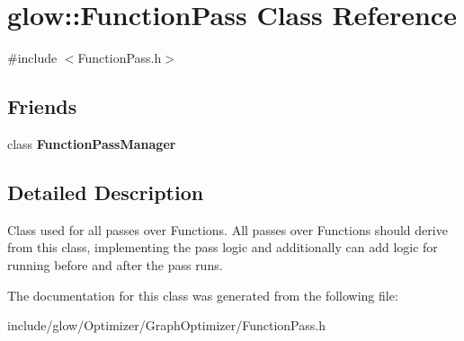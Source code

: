 \hypertarget{classglow_1_1_function_pass}{}\section{glow\+:\+:Function\+Pass Class Reference}
\label{classglow_1_1_function_pass}


{\ttfamily \#include $<$Function\+Pass.\+h$>$}

\subsection*{Friends}
\begin{DoxyCompactItemize}
\item 
\mbox{\label{classglow_1_1_function_pass_abae2bc7580611da9948873dc47e465bb}} 
class {\bfseries Function\+Pass\+Manager}
\end{DoxyCompactItemize}


\subsection{Detailed Description}
Class used for all passes over Functions. All passes over Functions should derive from this class, implementing the pass logic and additionally can add logic for running before and after the pass runs. 

The documentation for this class was generated from the following file\+:\begin{DoxyCompactItemize}
\item 
include/glow/\+Optimizer/\+Graph\+Optimizer/Function\+Pass.\+h\end{DoxyCompactItemize}
